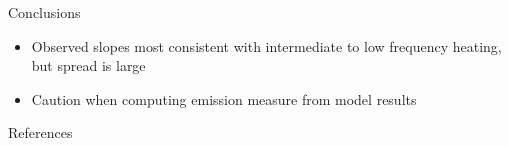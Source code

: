 \documentclass[final]{beamer}
\begin{document}
\begin{frame}
\begin{columns}[T]
\begin{column}{0.49\linewidth}
\begin{block}{Conclusions}
\begin{itemize}
        \item Observed slopes most consistent with intermediate to low frequency heating, but spread is large
        \item \alert{Caution when computing emission measure from model results}
      \end{itemize}
    \end{block}
    \begin{block}{References}
      \scriptsize
      \begin{multicols}{2}
        
        
      \end{multicols}
    \end{block}
  \end{column}
  \end{columns}
\end{frame}
\end{document}
